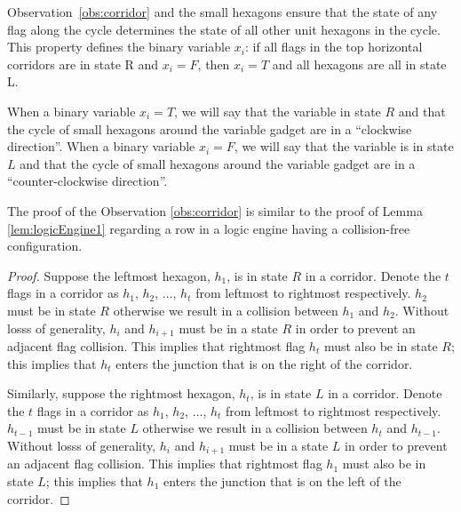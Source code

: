 \documentclass[10pt]{CSUNthesis}
\theoremstyle{plain}%
\theoremstyle{definition}
\theoremstyle{remark}
\begin{document}
Observation~\ref{obs:corridor} and the small hexagons ensure that the state of any flag along the cycle determines the state of all other unit hexagons in the cycle. 
This property defines the binary variable $x_i$: if all flags in the top horizontal corridors are in state R and $x_i=F$, then $x_i=T$ and all hexagons are all in state L.

When a binary variable $x_i = T$, we will say that the variable in state $R$ and that the cycle of small hexagons around the variable gadget are in a ``clockwise direction''.
When a binary variable $x_i = F$, we will say that the variable is in state $L$ and that the cycle of small hexagons around the variable gadget are in a ``counter-clockwise direction''. 

The proof of the Observation \ref{obs:corridor} is similar to the proof of Lemma \ref{lem:logicEngine1} regarding a row in a logic engine having a collision-free configuration.
\begin{proof}
Suppose the leftmost hexagon, $h_1$, is in state $R$ in a corridor.
Denote the $t$ flags in a corridor as $h_1$, $h_2$, $\ldots$, $h_t$ from leftmost to rightmost respectively.
$h_2$ must be in state $R$ otherwise we result in a collision between $h_1$ and $h_2$.
Without losss of generality, $h_i$ and $h_{i+1}$ must be in a state $R$ in order to prevent an adjacent flag collision. 
This implies that rightmost flag $h_t$ must also be in state $R$; this implies that $h_t$ enters the junction that is on the right of the corridor.

Similarly, suppose the rightmost hexagon, $h_t$, is in state $L$ in a corridor.
Denote the $t$ flags in a corridor as $h_1$, $h_2$, $\ldots$, $h_t$ from leftmost to rightmost respectively.
$h_{t-1}$ must be in state $L$ otherwise we result in a collision between $h_t$ and $h_{t-1}$.
Without losss of generality, $h_i$ and $h_{i+1}$ must be in a state $L$ in order to prevent an adjacent flag collision. 
This implies that rightmost flag $h_1$ must also be in state $L$; this implies that $h_1$ enters the junction that is on the left of the corridor.
\end{proof}
\end{document}
